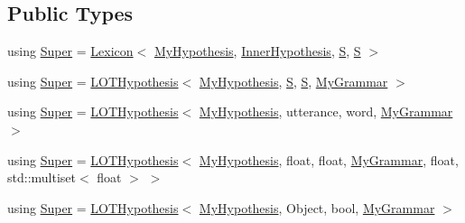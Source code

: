 \subsection*{Public Types}
\begin{DoxyCompactItemize}
\item 
using \hyperlink{class_my_hypothesis_a266742f266abc638ddc1d1870d735313}{Super} = \hyperlink{class_lexicon}{Lexicon}$<$ \hyperlink{class_my_hypothesis}{My\+Hypothesis}, \hyperlink{class_inner_hypothesis}{Inner\+Hypothesis}, \hyperlink{_models_2_formal_language_theory-_complex_2main_8cpp_a51c40915539205f0b5add30b0d68a4cb}{S}, \hyperlink{_models_2_formal_language_theory-_complex_2main_8cpp_a51c40915539205f0b5add30b0d68a4cb}{S} $>$
\item 
using \hyperlink{class_my_hypothesis_ae5fab2ea7ef7729968ac60a2ce267168}{Super} = \hyperlink{class_l_o_t_hypothesis}{L\+O\+T\+Hypothesis}$<$ \hyperlink{class_my_hypothesis}{My\+Hypothesis}, \hyperlink{_models_2_formal_language_theory-_complex_2main_8cpp_a51c40915539205f0b5add30b0d68a4cb}{S}, \hyperlink{_models_2_formal_language_theory-_complex_2main_8cpp_a51c40915539205f0b5add30b0d68a4cb}{S}, \hyperlink{class_my_grammar}{My\+Grammar} $>$
\item 
using \hyperlink{class_my_hypothesis_a1c1cfa95f1a49b273f8a93b3246342e6}{Super} = \hyperlink{class_l_o_t_hypothesis}{L\+O\+T\+Hypothesis}$<$ \hyperlink{class_my_hypothesis}{My\+Hypothesis}, utterance, word, \hyperlink{class_my_grammar}{My\+Grammar} $>$
\item 
using \hyperlink{class_my_hypothesis_aebf7eaf0477f8b39639e917bc87d208f}{Super} = \hyperlink{class_l_o_t_hypothesis}{L\+O\+T\+Hypothesis}$<$ \hyperlink{class_my_hypothesis}{My\+Hypothesis}, float, float, \hyperlink{class_my_grammar}{My\+Grammar}, float, std\+::multiset$<$ float $>$ $>$
\item 
using \hyperlink{class_my_hypothesis_af34a1c11e5b0aae4a52b54bfdd7a0617}{Super} = \hyperlink{class_l_o_t_hypothesis}{L\+O\+T\+Hypothesis}$<$ \hyperlink{class_my_hypothesis}{My\+Hypothesis}, Object, bool, \hyperlink{class_my_grammar}{My\+Grammar} $>$
\end{DoxyCompactItemize}
